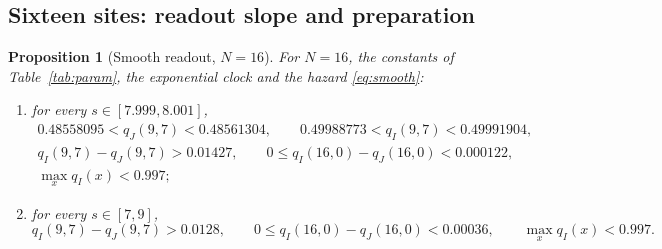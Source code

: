 \documentclass[11pt]{article}
\newtheorem{proposition}[theorem]{Proposition}
\theoremstyle{remark}
\begin{document}
\subsection{Sixteen sites: readout slope and preparation}
\begin{proposition}[Smooth readout, $N=16$]\label{prop:smooth}
For $N=16$, the constants of Table~\ref{tab:param}, the exponential clock and
the hazard \eqref{eq:smooth}:
\begin{enumerate}
\item[(a)] for every $s\in[7.999,8.001]$,
\begin{gather*}
 0.48558095<q_J(9,7)<0.48561304,\qquad 0.49988773<q_I(9,7)<0.49991904,\\
 q_I(9,7)-q_J(9,7)>0.01427,\qquad 0\le q_I(16,0)-q_J(16,0)<0.000122,\\
 \max_xq_I(x)<0.997;
\end{gather*}
\item[(b)] for every $s\in[7,9]$,
\[
 q_I(9,7)-q_J(9,7)>0.0128,\qquad 0\le q_I(16,0)-q_J(16,0)<0.00036,\qquad \max_xq_I(x)<0.997 .
\]
\end{enumerate}
\end{proposition}
\end{document}
